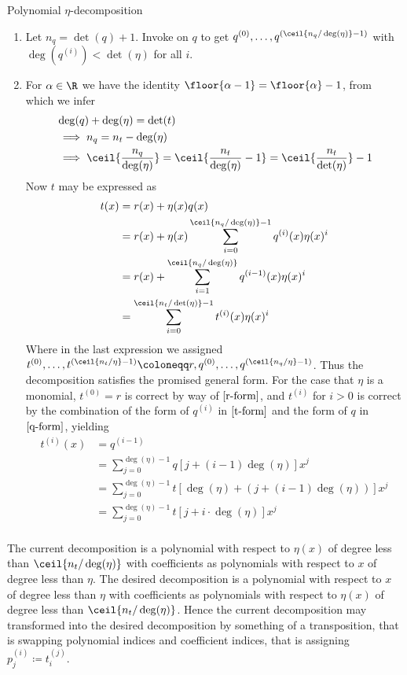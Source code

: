 \begin{theorem}{Polynomial $\eta$-decomposition}
\begin{enumerate}
        \item
        Let $n_q=\det(q)+1$.
        Invoke  on $q$ to get $q^{(0)},\dots,q^{(\ceil{n_q/\deg(\eta)}-1)}$ with $\deg(q^{(i)})<\det(\eta)$ for all $i$.

        \item
        For $\alpha\in\R$ we have the identity $\floor{\alpha-1} = \floor{\alpha}-1$, from which we infer
        \begin{align}
            &\deg(q)+\deg(\eta)=\det(t) \\
            &\implies n_q = n_t-\deg(\eta) \\
            &\implies \ceil{\frac{n_q}{\deg(\eta)}}
                = \ceil{\frac{n_t}{\deg(\eta)}-1}
                = \ceil{\frac{n_t}{\det(\eta)}}-1
        \end{align}
        Now $t$ may be expressed as
        \begin{align}
            t(x)
            &= r(x) + \eta(x)q(x) \\
            &= r(x) + \eta(x)\sum_{i=0}^{\ceil{n_q/\deg(\eta)}-1} q^{(i)}(x)\eta(x)^i \\
            &= r(x) + \sum_{i=1}^{\ceil{n_q/\deg(\eta)}} q^{(i-1)}(x)\eta(x)^i \\
            &= \sum_{i=0}^{\ceil{n_t/\det(\eta)}-1} t^{(i)}(x)\eta(x)^i
        \end{align}
        Where in the last expression we assigned $t^{(0)},\dots,t^{(\ceil{n_t/\eta}-1)} \coloneqq r,q^{(0)},\dots,q^{(\ceil{n_q/\eta}-1)}$.
        Thus the decomposition satisfies the promised general form.
        For the case that $\eta$ is a monomial, $t^{(0)}=r$ is correct by way of $\eqref{r-form}$, and $t^{(i)}$ for $i>0$ is correct by the combination of the form of $q^{(i)}$ in $\eqref{t-form}$ and the form of $q$ in $\eqref{q-form}$, yielding
        \begin{align}
            t^{(i)}(x) &= q^{(i-1)} \\
            &= \sum_{j=0}^{\deg(\eta)-1} q[j+(i-1)\deg(\eta)]x^j \\
            &= \sum_{j=0}^{\deg(\eta)-1} t[\deg(\eta)+(j+(i-1)\deg(\eta))]x^j \\
            &= \sum_{j=0}^{\deg(\eta)-1} t[j+i\cdot\deg(\eta)]x^j \\
        \end{align}
    \end{enumerate}

    The current decomposition is a polynomial with respect to $\eta(x)$ of degree less than $\ceil{n_t/\deg(\eta)}$ with coefficients as polynomials with respect to $x$ of degree less than $\eta$. 
    The desired decomposition is a polynomial with respect to $x$ of degree less than $\eta$ with coefficients as polynomials with respect to $\eta(x)$ of degree less than $\ceil{n_t/\deg(\eta)}$.
    Hence the current decomposition may transformed into the desired decomposition by something of a transposition, that is swapping polynomial indices and coefficient indices, that is assigning $p_j^{(i)}\coloneqq t_i^{(j)}$.
\end{theorem}


